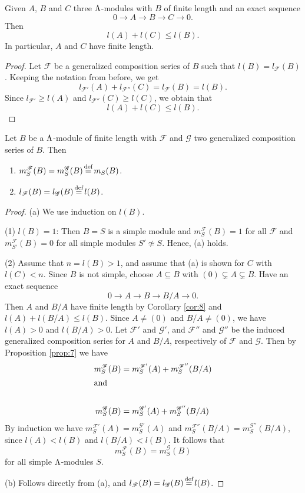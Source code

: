 \begin{cor}\label{cor:8}
Given $A$, $B$ and $C$ three $\Lambda$-modules with $B$ of finite length
and an exact sequence
\[0\to A\to B\to C\to 0.\]
Then
\[l(A) + l(C) \leq l(B).\]
In particular, $A$ and $C$ have finite length. 
\end{cor}
\begin{proof}
  Let $\mathscr{F}$ be a generalized composition series of $B$ such
  that $l(B) = l_{\mathscr{F}}(B)$.  Keeping the notation from before,
  we get
  \[l_{\mathscr{F}'}(A) + l_{\mathscr{F}''}(C) = l_{\mathscr{F}}(B) =
    l(B).\]
  Since $l_{\mathscr{F}'} \geq l(A)$ and $l_{\mathscr{F}''}(C) \geq
  l(C)$, we obtain that 
\[l(A) + l(C) \leq l(B).\]
\end{proof}

\begin{thm}\label{thm:9}
Let $B$ be a $\Lambda$-module of finite length with $\mathscr{F}$ and
$\mathscr{G}$ two generalized composition series of $B$. Then
\begin{enumerate}[\rm(a)]
\item $m^{\mathscr{F}}_S(B) = m^{\mathscr{G}}_S(B) \defeq m_S(B)$.
\item $l_{\mathscr{F}}(B) = l_{\mathscr{G}}(B) \defeq l(B)$. 
\end{enumerate}
\end{thm}
\begin{proof}
(a) We use induction on $l(B)$. 

(1) $l(B) =1$: Then $B=S$ is a simple module and $m^{\mathscr{F}}_S(B)
= 1$ for all $\mathscr{F}$ and $m^{\mathscr{F}}_{S'}(B) = 0$ for all
simple modules $S'\not\simeq S$.  Hence, (a) holds.

(2) Assume that $n = l(B) > 1$, and assume that (a) is shown for $C$
with $l(C) < n$.  Since $B$ is not simple, choose $A\subseteq B$ with
$(0)\subsetneq A \subsetneq B$.  Have an exact sequence
\[0\to A\to B\to B/A\to 0.\]
Then $A$ and $B/A$ have finite length by Corollary \ref{cor:8} and
$l(A) + l(B/A) \leq l(B)$.  Since $A\neq (0)$ and $B/A\neq (0)$, we
have $l(A) > 0$ and $l(B/A) > 0$. Let $\mathscr{F}'$ and
$\mathscr{G}'$, and $\mathscr{F}''$ and $\mathscr{G}''$ be the induced
generalized composition series for $A$ and $B/A$, respectively of
$\mathscr{F}$ and $\mathscr{G}$.  Then by Proposition \ref{prop:7} we
have
\begin{align}
m^{\mathscr{F}}_S(B) & = m^{\mathscr{F}'}_S(A) + m^{\mathscr{F}''}_S(B/A) \notag\\
\intertext{and}\notag\\
m^{\mathscr{G}}_S(B) & = m^{\mathscr{G}'}_S(A) +
                       m^{\mathscr{G}''}_S(B/A) \notag
\end{align}
By induction we have $m^{\mathscr{F}'}_S(A) = m^{\mathscr{G}'}_S(A)$
and $m^{\mathscr{F}''}_S(B/A) = m^{\mathscr{G}''}_S(B/A)$, since $l(A)
< l(B)$ and $l(B/A) < l(B)$.  It follows that
\[m^{\mathscr{F}}_S(B) = m^{\mathscr{G}}_S(B)\]
for all simple $\Lambda$-modules $S$.  

(b) Follows directly from (a), and $l_{\mathscr{F}}(B) =
l_{\mathscr{G}}(B) \defeq l(B)$. 
\end{proof}

